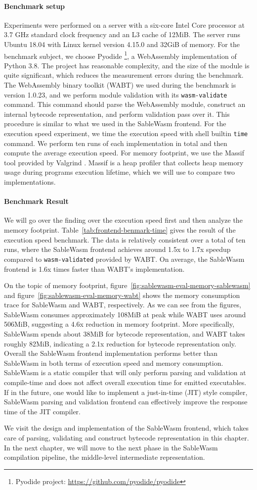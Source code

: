 \paragraph{Benchmark setup}
Experiments were performed on a server with a six-core Intel Core processor at 3.7 GHz standard clock frequency and an L3 cache of 12MiB. The server runs Ubuntu 18.04 with Linux kernel version 4.15.0 and 32GiB of memory. For the benchmark subject, we choose Pyodide \footnote{Pyodide project: \url{https://github.com/pyodide/pyodide}}, a WebAssembly implementation of Python 3.8. The project has reasonable complexity, and the size of the module is quite significant, which reduces the measurement errors during the benchmark. The WebAssembly binary toolkit (WABT) we used during the benchmark is version 1.0.23, and we perform module validation with its \texttt{wasm-validate} command. This command should parse the WebAssembly module, construct an internal bytecode representation, and perform validation pass over it. This procedure is similar to what we used in the SableWasm frontend. For the execution speed experiment, we time the execution speed with shell builtin \texttt{time} command. We perform ten runs of each implementation in total and then compute the average execution speed. For memory footprint, we use the Massif tool provided by Valgrind \cite{valgrind-paper}. Massif is a heap profiler that collects heap memory usage during programs execution lifetime, which we will use to compare two implementations. 

\paragraph{Benchmark Result}
We will go over the finding over the execution speed first and then analyze the memory footprint. Table~\ref{tab:frontend-benmark-time} gives the result of the execution speed benchmark. The data is relatively consistent over a total of ten runs, where the SableWasm frontend achieves around 1.5x to 1.7x speedup compared to \texttt{wasm-validated} provided by WABT. On average, the SableWasm frontend is 1.6x times faster than WABT's implementation.



On the topic of memory footprint, figure~\ref{fig:sablewasm-eval-memory-sablewasm} and figure~\ref{fig:sablewasm-eval-memory-wabt} shows the memory consumption trace for SableWasm and WABT, respectively. As we can see from the figures, SableWasm consumes approximately 108MiB at peak while WABT uses around 506MiB, suggesting a 4.6x reduction in memory footprint. More specifically, SableWasm spends about 38MiB for bytecode representation, and WABT takes roughly 82MiB, indicating a 2.1x reduction for bytecode representation only. Overall the SableWasm frontend implementation performs better than SableWasm in both terms of execution speed and memory consumption. SableWasm is a static compiler that will only perform parsing and validation at compile-time and does not affect overall execution time for emitted executables. If in the future, one would like to implement a just-in-time (JIT) style compiler, SableWasm parsing and validation frontend can effectively improve the response time of the JIT compiler. 

We visit the design and implementation of the SableWasm frontend, which takes care of parsing, validating and construct bytecode representation in this chapter. In the next chapter, we will move to the next phase in the SableWasm compilation pipeline, the middle-level intermediate representation.